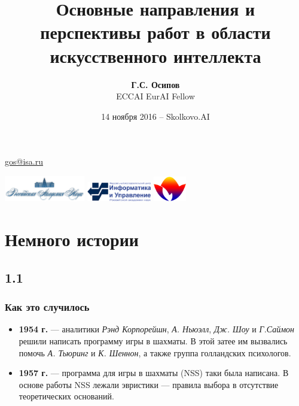 \documentclass[default]{beamer}
\begin{document}
	
	\title[Направления и перспективы ИИ]{Основные направления и перспективы работ в области искусственного интеллекта}
	\author[Г.С. Осипов]{\textbf{Г.С. Осипов}\\ECCAI EurAI Fellow}
	\date{14 ноября 2016 -- Skolkovo.AI} 
	
	{
	\begin{frame}
		
		\titlepage
		\centering
		\href{mailto:gos@isa.ru}{gos@isa.ru}
		
		\includegraphics[width=100pt]{misc/logos/ras.png} \hspace{10pt}
		\includegraphics[width=80pt]{misc/logos/frccsc.png} \hspace{10pt}
		\includegraphics[width=40pt]{misc/logos/raai.png}
	\end{frame}
	}	

	\section{Немного истории}
	\subsection{1.1}
	\begin{frame}
		\frametitle{Как это случилось}

		\begin{itemize}
			\item \textbf{1954 г.} --- аналитики \textit{Рэнд Корпорейшн}, \textit{А. Ньюэлл}, \textit{Дж. Шоу} и \textit{Г.Саймон}  решили написать программу игры в шахматы. В этой затее им вызвались помочь \textit{А. Тьюринг} и \textit{К. Шеннон}, а также группа голландских психологов.
			\item \textbf{1957 г.} --- программа для игры в шахматы (NSS) таки была написана. В основе работы NSS лежали эвристики --- правила выбора в отсутствие теоретических оснований.
		\end{itemize}
	\end{frame}
\end{document}
